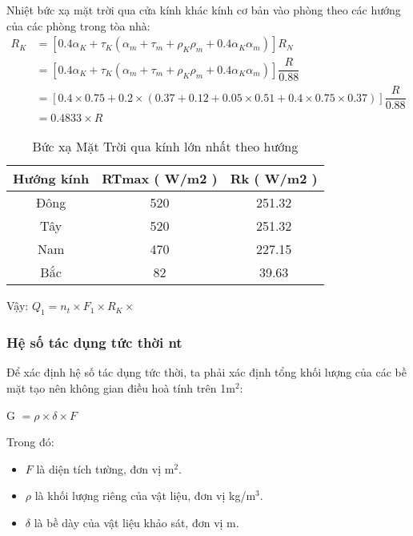 Nhiệt bức xạ mặt trời qua cửa kính khác kính cơ bản vào phòng theo các hướng của các phòng trong tòa nhà:
\begin{equation*}
	\begin{split}
		R_{K} &= [0.4\alpha_{K} + \tau_{K}(\alpha_{m} + \tau_{m} + \rho_{K}\rho_{m} + 0.4\alpha_{K}\alpha_{m})]R_{N} \\
		&= [0.4\alpha_{K} + \tau_{K}(\alpha_{m} + \tau_{m} + \rho_{K}\rho_{m} + 0.4\alpha_{K}\alpha_{m})]\dfrac{R}{0.88} \\
		&= [0.4\times0.75 + 0.2\times(0.37 + 0.12 + 0.05\times0.51 + 0.4\times0.75\times0.37)]\dfrac{R}{0.88} \\
		&= 0.4833\times R
	\end{split}
\end{equation*}
\begin{table}[H]
	\vspace{-0.3cm}
	\centering
	\caption{Bức xạ Mặt Trời qua kính lớn nhất theo hướng}
	\begin{tabular}{|c|c|c|}
		\hline
		\textbf{Hướng kính} & \textbf{RTmax ( W/m2 )} & \textbf{Rk ( W/m2 )} \bigstrut\\
		\hline
		Đông  & 520   & 251.32 \bigstrut\\
		\hline
		Tây   & 520   & 251.32 \bigstrut\\
		\hline
		Nam   & 470   & 227.15 \bigstrut\\
		\hline
		Bắc   & 82    & 39.63 \bigstrut\\
		\hline
	\end{tabular}
	\label{b:bxmtln}
\end{table}
Vậy: $Q_{1} = n_{t}\times F_{1}\times R_{K}\times $

\subsubsection{Hệ số tác dụng tức thời n{\scriptsize t}}
Để xác định hệ số tác dụng tức thời, ta phải xác định tổng khối lượng của các bề mặt tạo nên không gian điều hoà tính trên 1m$^2$:

\begin{center}
	G $= \rho \times \delta \times F$
\end{center}

Trong đó:
\begin{itemize}
	\item $F$ là diện tích tường, đơn vị m$^2$.
	\item $\rho$ là khối lượng riêng của vật liệu, đơn vị kg/m$^3$.
	\item $\delta$ là bề dày của vật liệu khảo sát, đơn vị m.
\end{itemize}

